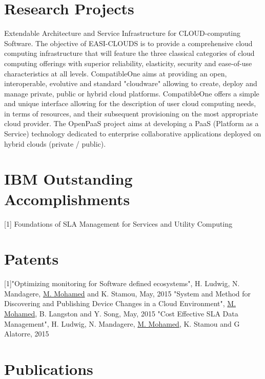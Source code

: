 \documentclass[11pt,a4paper,sans]{moderncv}   %
\begin{document}
\section{Research Projects}
 {Extendable Architecture and Service Infrastructure for CLOUD-computing Software. The objective of EASI-CLOUDS is to provide a comprehensive cloud computing infrastructure that will feature the three classical categories of cloud computing offerings with superior reliability, elasticity, security and ease-of-use characteristics at all levels.}
 {CompatibleOne aims at providing an open, interoperable, evolutive and standard "cloudware" allowing to create, deploy and manage private, public or hybrid cloud platforms. CompatibleOne offers a simple and unique interface allowing for the description of user cloud computing needs, in terms of resources, and their subsequent provisioning on the most appropriate cloud provider.}
 {The OpenPaaS project aims at developing a PaaS (Platform as a Service) technology dedicated to enterprise collaborative applications deployed on hybrid clouds (private / public).}

\section{IBM Outstanding Accomplishments}
[1] Foundations of SLA Management for Services and Utility Computing
\section{Patents}
[1]"Optimizing monitoring for Software defined ecosystems", H. Ludwig, N. Mandagere, \underline{M. Mohamed} and K. Stamou, May, 2015 \newline
[2] "System and Method for Discovering and Publishing Device Changes in a Cloud Environment", \underline{M. Mohamed}, B. Langston and Y. Song, May, 2015
\newline
[3] "Cost Effective SLA Data Management", H. Ludwig, N. Mandagere, \underline{M. Mohamed}, K. Stamou and G Alatorre, 2015
\section{Publications}
\end{document}
